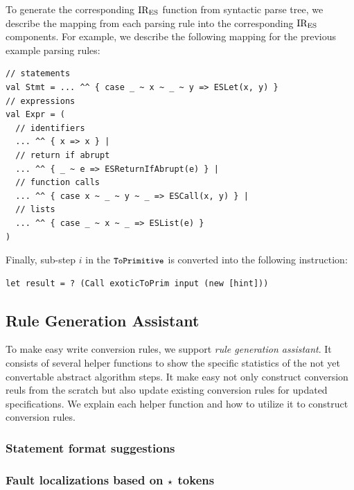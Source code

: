To generate the corresponding \( \text{IR}_\text{ES} \) function from syntactic parse tree,
we describe the mapping from each parsing rule into the corresponding \( \text{IR}_\text{ES} \) components.
For example, we describe the following mapping for the previous example parsing rules:
\begin{lstlisting}[style=myScalastyle]
// statements
val Stmt = ... ^^ { case _ ~ x ~ _ ~ y => ESLet(x, y) }
// expressions
val Expr = (
  // identifiers
  ... ^^ { x => x } |
  // return if abrupt
  ... ^^ { _ ~ e => ESReturnIfAbrupt(e) } |
  // function calls
  ... ^^ { case x ~ _ ~ y ~ _ => ESCall(x, y) } |
  // lists
  ... ^^ { case _ ~ x ~ _ => ESList(e) }
)
\end{lstlisting}
Finally, sub-step \( i \) in the \( \texttt{\small ToPrimitive} \) is converted
into the following instruction:
\begin{lstlisting}[style=ires]
let result = ? (Call exoticToPrim input (new [hint]))
\end{lstlisting}

\subsection{Rule Generation Assistant}

To make easy write conversion rules, we support \textit{rule generation assistant}.
It consists of several helper functions to show the specific statistics of
the not yet convertable abstract algorithm steps. It make easy not only construct
conversion reuls from the scratch but also update existing conversion rules
for updated specifications. We explain each helper function and how to utilize
it to construct conversion rules.

\subsubsection{Statement format suggestions}


\subsubsection{Fault localizations based on \( \star \) tokens}

